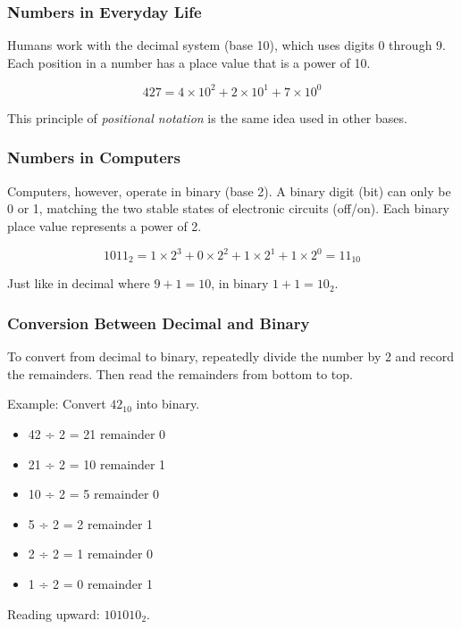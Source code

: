 \documentclass[
  letterpaper,
  DIV=11,
  numbers=noendperiod]{scrreprt}
\providecommand{\tightlist}{%
  \setlength{\itemsep}{0pt}\setlength{\parskip}{0pt}}
\begin{document}
\subsubsection{Numbers in Everyday Life}\label{numbers-in-everyday-life}

Humans work with the decimal system (base 10), which uses digits 0
through 9. Each position in a number has a place value that is a power
of 10.

\[
427 = 4 \times 10^2 + 2 \times 10^1 + 7 \times 10^0
\]

This principle of \emph{positional notation} is the same idea used in
other bases.

\subsubsection{Numbers in Computers}\label{numbers-in-computers}

Computers, however, operate in binary (base 2). A binary digit (bit) can
only be 0 or 1, matching the two stable states of electronic circuits
(off/on). Each binary place value represents a power of 2.

\[
1011_2 = 1 \times 2^3 + 0 \times 2^2 + 1 \times 2^1 + 1 \times 2^0 = 11_{10}
\]

Just like in decimal where \(9 + 1 = 10\), in binary \(1 + 1 = 10_2\).

\subsubsection{Conversion Between Decimal and
Binary}\label{conversion-between-decimal-and-binary}

To convert from decimal to binary, repeatedly divide the number by 2 and
record the remainders. Then read the remainders from bottom to top.

Example: Convert \(42_{10}\) into binary.

\begin{itemize}
\tightlist
\item
  42 ÷ 2 = 21 remainder 0
\item
  21 ÷ 2 = 10 remainder 1
\item
  10 ÷ 2 = 5 remainder 0
\item
  5 ÷ 2 = 2 remainder 1
\item
  2 ÷ 2 = 1 remainder 0
\item
  1 ÷ 2 = 0 remainder 1
\end{itemize}

Reading upward: \(101010_2\).
\end{document}
